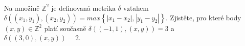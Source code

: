 \subsubsection{}
Na množině $\mathbb{Z}^{2}$ je definovaná metrika $\delta$ vztahem $\delta
((x_{1},y_{1}), (x_{2},y_{2})) = max \left \{ \left | x_{1}-x_{2} \right |,\left
| y_{1}-y_{2} \right | \right \}$. Zjistěte, pro které body $(x,y) \in
\mathbb{Z}^{2}$ platí současně $\delta ((-1,1), (x,y))= 3$ a
$\delta((3,0),(x,y))=2$.
